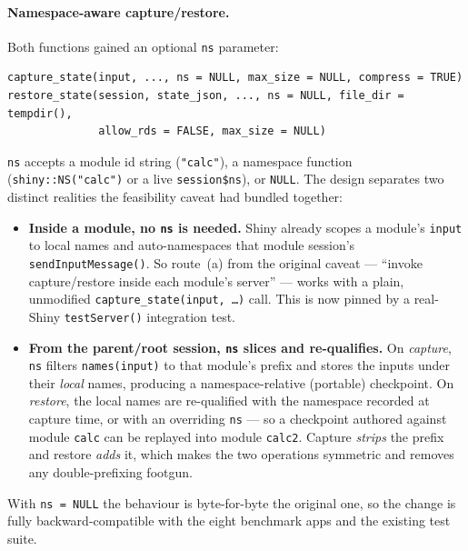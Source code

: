 \documentclass[12pt,a4paper]{article}
\begin{document}
\paragraph{Namespace-aware capture/restore.} Both functions gained an optional
\texttt{ns} parameter:
\begin{verbatim}
capture_state(input, ..., ns = NULL, max_size = NULL, compress = TRUE)
restore_state(session, state_json, ..., ns = NULL, file_dir = tempdir(),
              allow_rds = FALSE, max_size = NULL)
\end{verbatim}
\texttt{ns} accepts a module id string (\texttt{"calc"}), a namespace function
(\texttt{shiny::NS("calc")} or a live \texttt{session\$ns}), or \texttt{NULL}.
The design separates two distinct realities the feasibility caveat had bundled
together:
\begin{itemize}[nosep]
  \item \textbf{Inside a module, no \texttt{ns} is needed.} Shiny already scopes
    a module's \texttt{input} to local names and auto-namespaces that module
    session's \texttt{sendInputMessage()}. So route~(a) from the original caveat
    --- ``invoke capture/restore inside each module's server'' --- works with a
    plain, unmodified \texttt{capture\_state(input, \dots)} call. This is now
    pinned by a real-Shiny \texttt{testServer()} integration test.
  \item \textbf{From the parent/root session, \texttt{ns} slices and
    re-qualifies.} On \emph{capture}, \texttt{ns} filters \texttt{names(input)}
    to that module's prefix and stores the inputs under their \emph{local} names,
    producing a namespace-relative (portable) checkpoint. On \emph{restore}, the
    local names are re-qualified with the namespace recorded at capture time, or
    with an overriding \texttt{ns} --- so a checkpoint authored against module
    \texttt{calc} can be replayed into module \texttt{calc2}. Capture
    \emph{strips} the prefix and restore \emph{adds} it, which makes the two
    operations symmetric and removes any double-prefixing footgun.
\end{itemize}
With \texttt{ns = NULL} the behaviour is byte-for-byte the original one, so the
change is fully backward-compatible with the eight benchmark apps and the
existing test suite.
\end{document}
